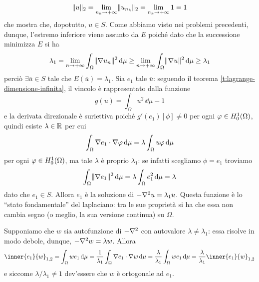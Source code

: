 \begin{equation}
    \norm{u}_2=\lim_{n_k\to+\infty}\norm{u_{n_k}}_2=\lim_{n_k\to+\infty}1=1
\end{equation}
che mostra che, dopotutto, $u\in S$.
Come abbiamo visto nei problemi precedenti, dunque, l'estremo inferiore viene assunto da $E$ poich\'e dato che la successione minimizza $E$ si ha 
\begin{equation}
    \lambda_1=
    \lim_{n\to+\infty}\int_\Omega\norm{\grad u_n}^2\,\dd\mu\ge
    \lim_{n\to+\infty}\int_\Omega\norm{\grad u}^2\,\dd\mu\ge
    \lambda_1
\end{equation}
perciò $\exists\bar{u}\in S$ tale che $E(\bar{u})=\lambda_1$.
Sia $e_1$ tale $\bar{u}$: seguendo il teorema \ref{t:lagrange-dimensione-infinita}, il vincolo è rappresentato dalla funzione
\begin{equation}
    g(u)=\int_\Omega u^2\,\dd\mu-1
\end{equation}
e la derivata direzionale è suriettiva poich\'e $g'(e_1)[\phi]\ne 0$ per ogni $\phi\in\sobHc[1]{\Omega}$, quindi esiste $\lambda\in\R$ per cui %
\begin{equation}
    \int_\Omega\scalar{\grad e_1}{\grad\phi}\,\dd\mu=\lambda\int_\Omega u\phi\,\dd\mu
\end{equation}
per ogni $\phi\in\sobHc[1]{\Omega}$, ma tale $\lambda$ è proprio $\lambda_1$: se infatti scegliamo $\phi=e_1$ troviamo
\begin{equation}
    \int_\Omega\norm{\grad e_1}^2\,\dd\mu=\lambda\int_\Omega e_1^2\,\dd\mu=\lambda
\end{equation}
dato che $e_1\in S$.
Allora $e_1$ è la soluzione di $-\lap u=\lambda_1u$.
Questa funzione è lo ``stato fondamentale'' del laplaciano: tra le sue proprietà si ha che essa non cambia segno (o meglio, la sua versione continua) su $\Omega$.
\begin{osservazione}
    Supponiamo che $w$ sia autofunzione di $-\lap$ con autovalore $\lambda\ne\lambda_1$: essa risolve in modo debole, dunque, $-\lap w=\lambda w$.
    Allora
    \begin{equation}
        \inner{e_1}{w}_{1,2}=
        \int_\Omega we_1\,\dd\mu=
        \frac1{\lambda_1}\int_\Omega\scalar{\grad e_1}{\grad w}\,\dd\mu=
        \frac{\lambda}{\lambda_1}\int_\Omega we_1\,\dd\mu=
        \frac{\lambda}{\lambda_1}\inner{e_1}{w}_{1,2}
    \end{equation}
    e siccome $\lambda/\lambda_1\ne 1$ dev'essere che $w$ è ortogonale ad $e_1$.
\end{osservazione}

